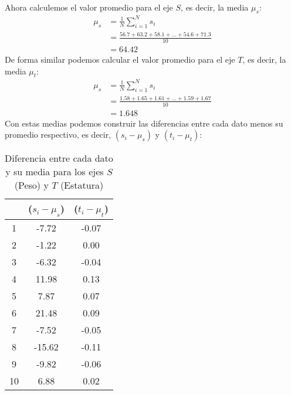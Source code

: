 \documentclass{article}
\begin{document}
\\
Ahora calculemos el valor promedio para el eje $S$, es decir, la media $\mu_s$:
\begin{equation}
    \begin{aligned}
        \mu_s &= \frac{1}{N} \sum_{i=1}^{N} s_i \\
        &= \frac{56.7 + 63.2 + 58.1 + ... + 54.6 + 71.3}{10} \\
        &= 64.42
    \end{aligned}
\end{equation}
De forma similar podemos calcular el valor promedio para el eje $T$, es decir, la media $\mu_t$:
\begin{equation}
    \begin{aligned}
        \mu_s &= \frac{1}{N} \sum_{i=1}^{N} s_i \\
        &= \frac{1.58 + 1.65 + 1.61 + ... + 1.59 + 1.67}{10} \\
        &= 1.648
    \end{aligned}
\end{equation}
Con estas medias podemos construir las diferencias entre cada dato menos su promedio respectivo, es decir, $(s_i - \mu_s)$ y $(t_i - \mu_t)$:
\begin{table}[h!]
    \centering
    \begin{tabular}{|c|c|c|}
    \hline
    & ($s_i - \mu_s$) & ($t_i - \mu_t$) \\ \hline
    1 & -7.72 & -0.07 \\ \hline
    2 & -1.22 & 0.00 \\ \hline
    3 & -6.32 & -0.04 \\ \hline
    4 & 11.98 & 0.13 \\ \hline
    5 & 7.87 & 0.07 \\ \hline
    6 & 21.48 & 0.09 \\ \hline
    7 & -7.52 & -0.05 \\ \hline
    8 & -15.62 & -0.11 \\ \hline
    9 & -9.82 & -0.06 \\ \hline
    10 & 6.88 & 0.02 \\ \hline
    \end{tabular}
    \caption{Diferencia entre cada dato y su media para los ejes $S$ (Peso) y $T$ (Estatura)}
\end{table}

\clearpage
\end{document}
